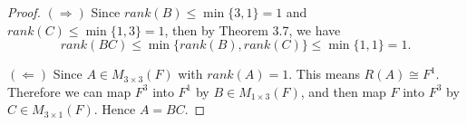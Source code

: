 \begin{Exercise}
\begin{proof}
$(\Longrightarrow)$
Since $rank(B)\leq \min\{3,1\} = 1$ and $rank(C)\leq \min\{1,3\} = 1$, then by Theorem 3.7, we have 
$$
rank(BC)\leq \min\{rank(B), rank(C)\} \leq \min\{1,1\} = 1.
$$

\vspace{2ex}

$(\Longleftarrow)$
Since $A\in M_{3\times 3}(F)$ with $rank(A) = 1$. This means $R(A)\cong F^1$. Therefore we can map $F^3$ into $F^1$ by $B\in M_{1\times 3}(F)$, and then map $F$ into $F^3$ by $C\in M_{3\times 1}(F)$. Hence $A=BC$.
\end{proof}
\end{Exercise}